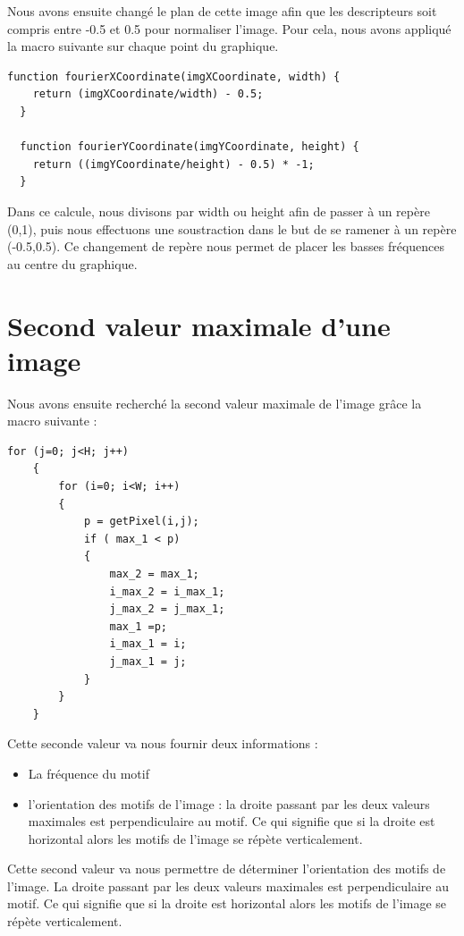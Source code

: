 \documentclass[a4paper,11pt]{article}
\begin{document}
  Nous avons ensuite changé le plan de cette image afin que les descripteurs soit compris entre -0.5
  et 0.5 pour normaliser l'image. Pour cela, nous avons appliqué la macro suivante sur chaque point du graphique.
  
  \begin{lstlisting}[caption=Fonctions de passage aux coordonnées dans le plan de Fourier]
  function fourierXCoordinate(imgXCoordinate, width) {
    return (imgXCoordinate/width) - 0.5;
  }

  function fourierYCoordinate(imgYCoordinate, height) {
    return ((imgYCoordinate/height) - 0.5) * -1;
  }
  \end{lstlisting}

  Dans ce calcule, nous divisons par width ou height afin de passer à un repère (0,1), puis nous effectuons une 
  soustraction dans le but de se ramener à un repère (-0.5,0.5). Ce changement de repère nous permet de placer
  les basses fréquences au centre du graphique.
  
  \section{Second valeur maximale d'une image}
  
  Nous avons ensuite recherché la second valeur maximale de l'image grâce la macro suivante :
  \begin{lstlisting}[caption=Fonctions de passage aux coordonnées dans le plan de Fourier]
  for (j=0; j<H; j++)
    {
        for (i=0; i<W; i++) 
        {
            p = getPixel(i,j);
            if ( max_1 < p)
            {
                max_2 = max_1;
                i_max_2 = i_max_1;
                j_max_2 = j_max_1;
                max_1 =p;
                i_max_1 = i;
                j_max_1 = j;
            } 
        }
    }
  \end{lstlisting}
  
  Cette seconde valeur va nous fournir deux informations :
  \begin{itemize}
   \item La fréquence du motif
   \item l'orientation des motifs de l'image : la droite passant
  par les deux valeurs maximales est perpendiculaire au motif. Ce qui signifie que si la droite est horizontal
  alors les motifs de l'image se répète verticalement.
  \end{itemize}

  Cette second valeur va nous permettre de déterminer l'orientation des motifs de l'image. La droite passant
  par les deux valeurs maximales est perpendiculaire au motif. Ce qui signifie que si la droite est horizontal
  alors les motifs de l'image se répète verticalement.
  
\end{document}
